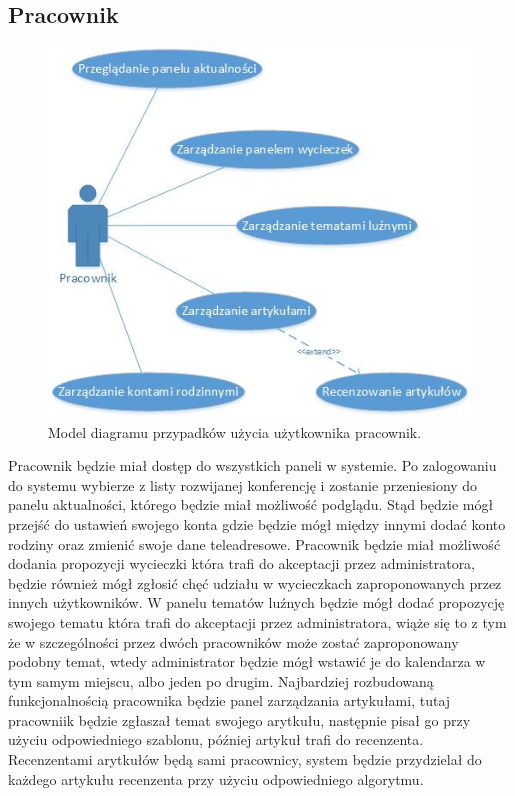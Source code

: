 \subsection{Pracownik}

\begin{figure}[!tb]
    \centering
    \includegraphics{pracownik.jpg}
    \caption{Model diagramu przypadków użycia użytkownika pracownik.}
    \label{fig:pracownik}
\end{figure}

Pracownik będzie miał dostęp do wszystkich paneli w systemie. Po zalogowaniu do systemu wybierze z listy rozwijanej konferencję i zostanie przeniesiony do panelu aktualności, którego będzie miał możliwość podglądu. Stąd będzie mógł przejść do ustawień swojego konta gdzie będzie mógł między innymi dodać konto rodziny oraz zmienić swoje dane teleadresowe.  \newline
Pracownik będzie miał możliwość dodania propozycji wycieczki która trafi do akceptacji przez administratora, będzie również mógł zgłosić chęć udziału w wycieczkach zaproponowanych przez innych użytkowników. \newline
W panelu tematów luźnych będzie mógł dodać propozycję swojego tematu która trafi do akceptacji przez administratora, wiąże się to z tym że w szczególności przez dwóch pracowników może zostać zaproponowany podobny temat, wtedy administrator będzie mógł wstawić je do kalendarza w tym samym miejscu, albo jeden po drugim. \newline
Najbardziej rozbudowaną funkcjonalnością pracownika będzie panel zarządzania artykułami, tutaj pracowniik będzie zgłaszał temat swojego arytkułu, następnie pisał go przy użyciu odpowiedniego szablonu, później artykuł trafi do recenzenta. Recenzentami arytkułów będą sami pracownicy, system będzie przydzielał do każdego artykułu recenzenta przy użyciu odpowiedniego algorytmu.


